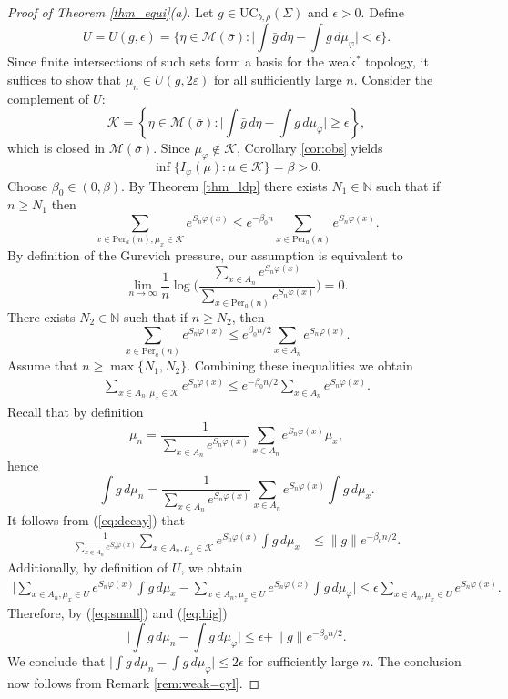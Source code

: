 \documentclass[letterpaper,11pt]{amsart}
\numberwithin{equation}{section}     %
\newcommand{\K}{\mathcal{K}}
\newcommand{\M}{\mathcal{M}}
\newcommand{\N}{\mathbb{N}}
\def\phi{\varphi}
\def\N{{\mathbb N}}
\def\M{{\mathcal M}}
\def\le{\leqslant}
\def\ge{\geqslant}
\def\M{\mathcal{M}}
\begin{document}
\begin{proof}[Proof of Theorem \ref{thm_equi}(a)]
Let $g\in \text{UC}_{b,\rho}(\Sigma)$ and $\epsilon>0$. Define 
$$U=U(g,\epsilon)=\bigg\{\eta  \in\M(\bar\sigma):\bigg|\int \bar{g} \, d\eta-\int g \, d\mu_\phi\bigg|< \epsilon\bigg\}.$$ 
Since finite intersections of such sets form a basis for the weak$^\ast$ topology, it suffices to show that $\mu_n \in U(g,2\varepsilon)$ for all sufficiently large $n$. Consider the complement  of $U$: 
$$\K=\left\{\eta \in \M(\bar\sigma):\bigg|\int \bar{g} \, d\eta-\int g \, d\mu_\phi \bigg| \ge \epsilon\right\},$$
which is closed in $\M(\bar\sigma)$.  Since $\mu_\phi \notin \K$, Corollary \ref{cor:obs} yields
 $$\inf \{I_\phi(\mu):\mu\in \K\}=\beta>0.$$  
Choose $\beta_0\in(0,\beta)$. By Theorem \ref{thm_ldp} there exists $N_1 \in \N$ such that if $n\ge N_1$ then 
$$\sum_{x\in \text{Per}_a(n), \mu_x\in \K}e^{S_n\phi(x)}\le e^{-\beta_0 n}\sum_{x\in \text{Per}_a(n)}e^{S_n\phi(x)}.$$
By definition of the Gurevich pressure, our assumption is equivalent to
$$\lim_{n\to\infty}\frac{1}{n}\log\bigg(\frac{\sum_{x\in A_n}e^{S_n\phi(x)}}{\sum_{x\in \text{Per}_a(n)}e^{S_n\phi(x)}}\bigg)=0.$$
There exists $N_2 \in \N$ such that if $n\ge N_2$, then
$$ \sum_{x\in \text{Per}_a(n)}e^{S_n\phi(x)}\le e^{\beta_0 n/2} \sum_{x\in A_n}e^{S_n\phi(x)}.$$
Assume that $n\ge\max\{N_1,N_2\}$. Combining these inequalities we obtain
\begin{align}\label{eq:decay} 
\sum_{x\in A_n,\mu_x\in \K}e^{S_n\phi(x)}\le e^{-\beta_0n/2}\sum_{x\in A_n}e^{S_n\phi(x)}.
\end{align}
Recall that by definition 
$$\mu_n=\frac{1}{\sum_{x\in A_n}e^{S_n\phi(x)}}\sum_{x\in A_n}e^{S_n\phi(x)}\mu_x,$$
hence
$$\int g \, d\mu_n=\frac{1}{\sum_{x\in A_n}e^{S_n\phi(x)}}\sum_{x\in A_n}e^{S_n\phi(x)}\int g \, d\mu_x.$$
It follows from (\ref{eq:decay}) that
\begin{align}\label{eq:small}
\frac{1}{\sum_{x\in A_n}e^{S_n\phi(x)}}\sum_{x\in A_n,\mu_x\in \K}e^{S_n\phi(x)}\int g \, d\mu_x & \le \|g\|e^{-\beta_0 n/2}.
\end{align}
Additionally, by definition of $U$, we obtain
\begin{align}\label{eq:big}
\bigg|\sum_{x\in A_n,\mu_x\in U}e^{S_n\phi(x)}\int g \, d\mu_x-\sum_{x\in A_n,\mu_x\in U}e^{S_n\phi(x)}\int g \, d\mu_\phi\bigg| \le \epsilon \sum_{x\in A_n,\mu_x\in U}e^{S_n\phi(x)}.
\end{align}
Therefore, by (\ref{eq:small}) and (\ref{eq:big})
$$\bigg|\int g \, d\mu_n-\int g \, d\mu_\phi\bigg|\le \epsilon+\|g\|e^{-\beta_0n/2}.$$
We conclude that $\bigg|\int g \, d\mu_n-\int g \, d\mu_\phi\bigg|\le 2\epsilon$ for sufficiently large $n$. The conclusion now follows from Remark \ref{rem:weak=cyl}.
\end{proof}
\end{document}
